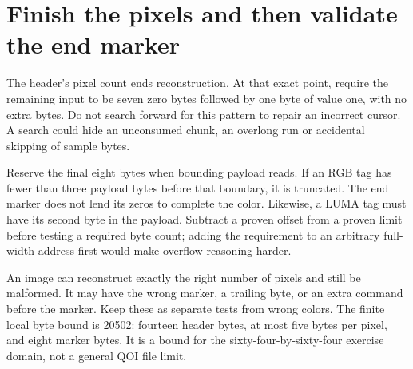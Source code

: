 \section{Finish the pixels and then validate the end marker}
The header's pixel count ends reconstruction. At that exact point, require the remaining
input to be seven zero bytes followed by one byte of value one, with no extra bytes.
Do not search forward for this pattern to repair an incorrect cursor. A search could
hide an unconsumed chunk, an overlong run or accidental skipping of sample bytes.

Reserve the final eight bytes when bounding payload reads. If an RGB tag has fewer
than three payload bytes before that boundary, it is truncated. The end marker does
not lend its zeros to complete the color. Likewise, a LUMA tag must have its second
byte in the payload. Subtract a proven offset from a proven limit before testing a
required byte count; adding the requirement to an arbitrary full-width address first
would make overflow reasoning harder.

An image can reconstruct exactly the right number of pixels and still be malformed.
It may have the wrong marker, a trailing byte, or an extra command before the marker.
Keep these as separate tests from wrong colors. The finite local byte bound is 20502:
fourteen header bytes, at most five bytes per pixel, and eight marker bytes. It is a
bound for the sixty-four-by-sixty-four exercise domain, not a general QOI file limit.
